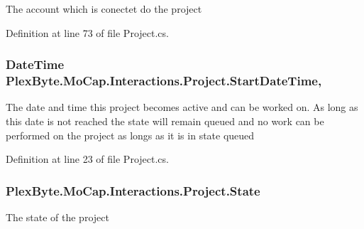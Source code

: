 The account which is conectet do the project 



Definition at line 73 of file Project.\+cs.

\subsubsection[{\texorpdfstring{Start\+Date\+Time}{StartDateTime}}]{\setlength{\rightskip}{0pt plus 5cm}Date\+Time Plex\+Byte.\+Mo\+Cap.\+Interactions.\+Project.\+Start\+Date\+Time\hspace{0.3cm}{\ttfamily [get]}, {\ttfamily [set]}}\hypertarget{class_plex_byte_1_1_mo_cap_1_1_interactions_1_1_project_ab1d85e04faa4f114a466abf8f238b7d5}{}\label{class_plex_byte_1_1_mo_cap_1_1_interactions_1_1_project_ab1d85e04faa4f114a466abf8f238b7d5}


The date and time this project becomes active and can be worked on. As long as this date is not reached the state will remain queued and no work can be performed on the project as longs as it is in state queued 



Definition at line 23 of file Project.\+cs.

\subsubsection[{\texorpdfstring{State}{State}}]{ Plex\+Byte.\+Mo\+Cap.\+Interactions.\+Project.\+State\hspace{0.3cm}{\ttfamily [get]}}\hypertarget{class_plex_byte_1_1_mo_cap_1_1_interactions_1_1_project_ae322c2cd5f5b5a080c6f6f17badeaa2b}{}\label{class_plex_byte_1_1_mo_cap_1_1_interactions_1_1_project_ae322c2cd5f5b5a080c6f6f17badeaa2b}


The state of the project 



